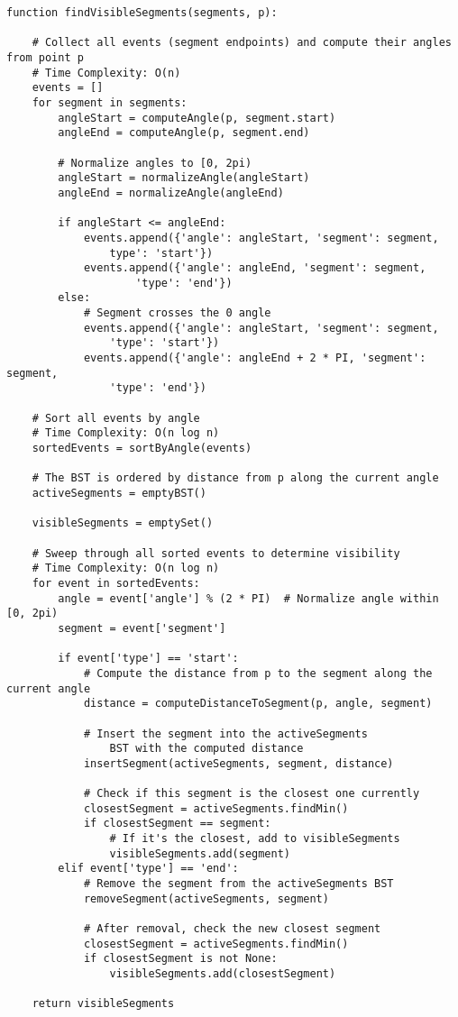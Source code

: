 \documentclass{article}
\begin{document}
\begin{verbatim}
function findVisibleSegments(segments, p):

    # Collect all events (segment endpoints) and compute their angles from point p
    # Time Complexity: O(n)
    events = []
    for segment in segments:
        angleStart = computeAngle(p, segment.start)
        angleEnd = computeAngle(p, segment.end)

        # Normalize angles to [0, 2pi)
        angleStart = normalizeAngle(angleStart)
        angleEnd = normalizeAngle(angleEnd)

        if angleStart <= angleEnd:
            events.append({'angle': angleStart, 'segment': segment, 
                type': 'start'})
            events.append({'angle': angleEnd, 'segment': segment, 
                    'type': 'end'})
        else:
            # Segment crosses the 0 angle
            events.append({'angle': angleStart, 'segment': segment, 
                'type': 'start'})
            events.append({'angle': angleEnd + 2 * PI, 'segment': segment, 
                'type': 'end'})

    # Sort all events by angle
    # Time Complexity: O(n log n)
    sortedEvents = sortByAngle(events)

    # The BST is ordered by distance from p along the current angle
    activeSegments = emptyBST()

    visibleSegments = emptySet()

    # Sweep through all sorted events to determine visibility
    # Time Complexity: O(n log n)
    for event in sortedEvents:
        angle = event['angle'] % (2 * PI)  # Normalize angle within [0, 2pi)
        segment = event['segment']

        if event['type'] == 'start':
            # Compute the distance from p to the segment along the current angle
            distance = computeDistanceToSegment(p, angle, segment)
            
            # Insert the segment into the activeSegments
                BST with the computed distance
            insertSegment(activeSegments, segment, distance)
            
            # Check if this segment is the closest one currently
            closestSegment = activeSegments.findMin()
            if closestSegment == segment:
                # If it's the closest, add to visibleSegments
                visibleSegments.add(segment)
        elif event['type'] == 'end':
            # Remove the segment from the activeSegments BST
            removeSegment(activeSegments, segment)
            
            # After removal, check the new closest segment
            closestSegment = activeSegments.findMin()
            if closestSegment is not None:
                visibleSegments.add(closestSegment)

    return visibleSegments
\end{verbatim}
\end{document}
